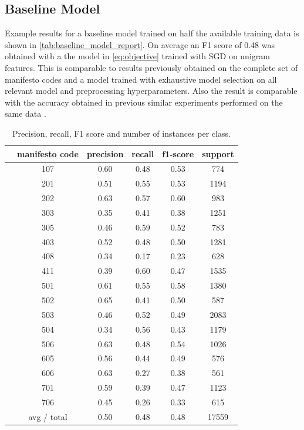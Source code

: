\documentclass[runningheads,a4paper]{article}
\begin{document}
\subsection{Baseline Model}\label{sec:results_baseline}
Example results for a baseline model trained on half the available training data is shown in \autoref{tab:baseline_model_report}. On average an F1 score of 0.48 was obtained with a the model in \autoref{eq:objective} trained with SGD on unigram features. This is comparable to results previously obtained on the complete set of manifesto codes and a model trained with exhaustive model selection on all relevant model and preprocessing hyperparameters. Also the result is comparable with the accuracy obtained in previous similar experiments performed on the same data \cite{Merz2016}.
\begin{table}
\centering
\begin{tabular}{cccccc}
\toprule
&  manifesto code & precision  &  recall&  f1-score &  support\\
\midrule
&   107&  0.60& 0.48& 0.53&  774\\
&   201&  0.51& 0.55& 0.53& 1194\\
&   202&  0.63& 0.57& 0.60&  983\\
&   303&  0.35& 0.41& 0.38& 1251\\
&   305&  0.46& 0.59& 0.52&  783\\
&   403&  0.52& 0.48& 0.50& 1281\\
&   408&  0.34& 0.17& 0.23&  628\\
&   411&  0.39& 0.60& 0.47& 1535\\
&   501&  0.61& 0.55& 0.58& 1380\\
&   502&  0.65& 0.41& 0.50&  587\\
&   503&  0.46& 0.52& 0.49& 2083\\
&   504&  0.34& 0.56& 0.43& 1179\\
&   506&  0.63& 0.48& 0.54& 1026\\
&   605&  0.56& 0.44& 0.49&  576\\
&   606&  0.63& 0.27& 0.38&  561\\
&   701&  0.59& 0.39& 0.47& 1123\\
&   706&  0.45& 0.26& 0.33&  615\\
\bottomrule
& avg / total&  0.50& 0.48& 0.48&17559\\
\end{tabular}
\caption{Precision, recall, F1 score and number of instances per class. }
\label{tab:baseline_model_report} 
\end{table}
\end{document}

